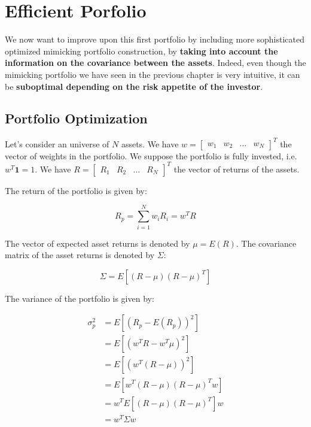 \chapter{Efficient Porfolio}
 
We now want to improve upon this first portfolio 
by including more sophisticated optimized mimicking 
portfolio construction, by \textbf{taking into account 
the information on the covariance between the 
assets}. Indeed, even though the mimicking portfolio we have 
seen in the previous chapter is very intuitive, 
it can be \textbf{suboptimal depending on the 
risk appetite of the investor}.

\section{Portfolio Optimization}

Let's consider an universe of $N$ assets. 
We have $w = \begin{bmatrix}
    w_1 & w_2 & \ldots & w_N
\end{bmatrix}^T$ the vector of weights in the
portfolio.
We suppose the portfolio is fully invested, i.e.
$w^T \mathbf{1} = 1$.
We have $R = \begin{bmatrix}
    R_1 & R_2 & \ldots & R_N
\end{bmatrix}^T$ the vector of returns of the assets.

The return of the portfolio is given by:

\begin{equation}
    R_p = \sum^N_{i=1} w_i R_i = w^T R
\end{equation}

The vector of expected asset returns is denoted by $\mu = E(R)$.
The covariance matrix of the asset returns is denoted by $\Sigma$:

\begin{equation}
    \Sigma = E[(R - \mu)(R - \mu)^T]
\end{equation}

The variance of the portfolio is given by:

\begin{equation}
    \begin{aligned}
        \sigma^2_p &= E[(R_p - E(R_p))^2] \\
        &= E[(w^T R - w^T \mu)^2] \\
        &= E[(w^T (R - \mu))^2] \\
        &= E[w^T (R - \mu)(R - \mu)^T w] \\
        &= w^T E[(R - \mu)(R - \mu)^T] w \\
        &= w^T \Sigma w
    \end{aligned}
\end{equation}

